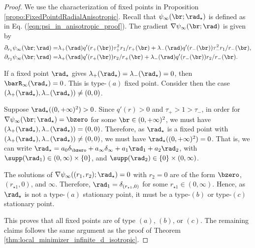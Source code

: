 \documentclass[11pt]{article}
\begin{document}
\begin{proof}
We use the characterization of fixed points in Proposition \ref{propo:FixedPointdRadialAnisotropic}.
Recall that $\psi_\infty(\br; \rad_\star)$ is defined as in Eq. (\ref{eqn:psi_in_anisotropic_proof}). The gradient $\nabla \psi_\infty(\br; \rad)$ is given by
\begin{equation}\label{eqn:stationary_in_anisotropic_proof}
\begin{aligned}
\partial_{r_1} \psi_\infty(\br; \rad) =& \lambda_+(\rad) q'(r_+(\br)) \tau_{+}^2 r_1 / r_+(\br) + \lambda_-(\rad) q'(r_-(\br)) \tau_{-}^2 r_1 / r_-(\br),\\
\partial_{r_2} \psi_\infty(\br; \rad) =& \lambda_+(\rad) q'(r_+(\br)) r_2 / r_+(\br) + \lambda_-(\rad) q'(r_-(\br)) r_2 / r_-(\br).
\end{aligned}
\end{equation}


If a fixed point $\rad_\star$ gives $\lambda_+(\rad_\star) = \lambda_-(\rad_\star)=0$, then $\barR_\infty(\rad_\star)=0$. This is type-$(a)$ fixed point. 
Consider then the case $(\lambda_+(\rad_\star), \lambda_-(\rad_\star)) \neq (0, 0)$. 

Suppose $\rad_\star((0, +\infty)^2) > 0$. Since $q'(r) > 0$ and $\tau_{+} > 1 > \tau_{-}$, in order for $\nabla \psi_\infty(\br; \rad_\star) = \bzero$ for some $\br \in (0, +\infty)^2$, we must have $(\lambda_+(\rad_\star), \lambda_-(\rad_\star)) = (0, 0)$. Therefore, as $\rad_\star$ is a fixed point with $(\lambda_+(\rad_\star), \lambda_-(\rad_\star)) \neq (0, 0)$, we must have $\rad_\star((0, +\infty)^2) = 0$. That is, we can write $\rad_\star = a_0 \delta_\bzero + a_\infty \delta_\infty + a_1 \rad_1 + a_2 \rad_2$, with $\supp(\rad_1) \in (0, \infty) \times \{0\}$, and $\supp(\rad_2) \in \{0\} \times (0, \infty) $. 

The solutions of $\nabla \psi_\infty((r_1, r_2); \rad_\star) = 0$ with $r_2 = 0$ are of the form $\bzero$, $(r_{\star1}, 0)$, and $\infty$. Therefore, $\rad_1 = \delta_{(r_{\star1}, 0)}$ for some $r_{\star1} \in (0, \infty)$. Hence, as $\rad_\star$ is not a type-$(a)$ stationary point, it must be a type-$(b)$ or type-$(c)$ stationary point. 

This proves that all fixed points are of type $(a)$, $(b)$, or $(c)$. The remaining claims follows the same argument as the proof of Theorem \ref{thm:local_minimizer_infinite_d_isotropic}. 

\end{proof}
\end{document}
